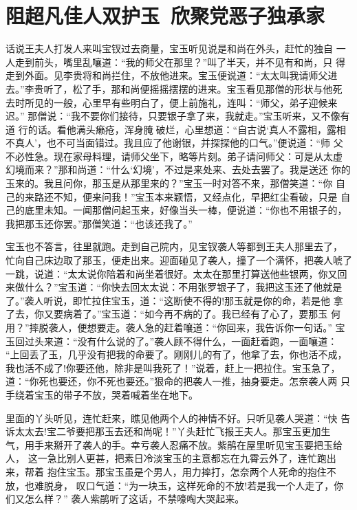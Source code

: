 \chapter{阻超凡佳人双护玉~欣聚党恶子独承家}

话说王夫人打发人来叫宝钗过去商量，宝玉听见说是和尚在外头，赶忙的独自
一人走到前头，嘴里乱嚷道：“我的师父在那里？”叫了半天，并不见有和尚，只
得走到外面。见李贵将和尚拦住，不放他进来。宝玉便说道：“太太叫我请师父进
去。”李贵听了，松了手，那和尚便摇摇摆摆的进来。宝玉看见那僧的形状与他死
去时所见的一般，心里早有些明白了，便上前施礼，连叫：“师父，弟子迎候来迟。”
那僧说：“我不要你们接待，只要银子拿了来，我就走。”宝玉听来，又不像有道
行的话。看他满头癞疮，浑身腌破烂，心里想道：“自古说‘真人不露相，露相
不真人’，也不可当面错过。我且应了他谢银，并探探他的口气。”便说道：“师
父不必性急。现在家母料理，请师父坐下，略等片刻。弟子请问师父：可是从太虚
幻境而来？”那和尚道：“什么‘幻境’，不过是来处来、去处去罢了。我是送还
你的玉来的。我且问你，那玉是从那里来的？”宝玉一时对答不来，那僧笑道：“你
自己的来路还不知，便来问我！”宝玉本来颖悟，又经点化，早把红尘看破，只是
自己的底里未知。一闻那僧问起玉来，好像当头一棒，便说道：“你也不用银子的，
我把那玉还你罢。”那僧笑道：“也该还我了。”

宝玉也不答言，往里就跑。走到自己院内，见宝钗袭人等都到王夫人那里去了，
忙向自己床边取了那玉，便走出来。迎面碰见了袭人，撞了一个满怀，把袭人唬了
一跳，说道：“太太说你陪着和尚坐着很好。太太在那里打算送他些银两，你又回
来做什么？”宝玉道：“你快去回太太说：不用张罗银子了，我把这玉还了他就是
了。”袭人听说，即忙拉住宝玉，道：“这断使不得的!那玉就是你的命，若是他
拿了去，你又要病着了。”宝玉道：“如今再不病的了。我已经有了心了，要那玉
何用？”摔脱袭人，便想要走。袭人急的赶着嚷道：“你回来，我告诉你一句话。”
宝玉回过头来道：“没有什么说的了。”袭人顾不得什么，一面赶着跑，一面嚷道：
“上回丢了玉，几乎没有把我的命要了。刚刚儿的有了，他拿了去，你也活不成，
我也活不成了!你要还他，除非是叫我死了！”说着，赶上一把拉住。宝玉急了，
道：“你死也要还，你不死也要还。”狠命的把袭人一推，抽身要走。怎奈袭人两
只手绕着宝玉的带子不放，哭着喊着坐在地下。

里面的丫头听见，连忙赶来，瞧见他两个人的神情不好。只听见袭人哭道：“快
告诉太太去!宝二爷要把那玉去还和尚呢！”丫头赶忙飞报王夫人。那宝玉更加生
气，用手来掰开了袭人的手。幸亏袭人忍痛不放。紫鹃在屋里听见宝玉要把玉给人，
这一急比别人更甚，把素日冷淡宝玉的主意都忘在九霄云外了，连忙跑出来，帮着
抱住宝玉。那宝玉虽是个男人，用力摔打，怎奈两个人死命的抱住不放，也难脱身，
叹口气道：“为一块玉，这样死命的不放!若是我一个人走了，你们又怎么样？”
袭人紫鹃听了这话，不禁嚎啕大哭起来。

